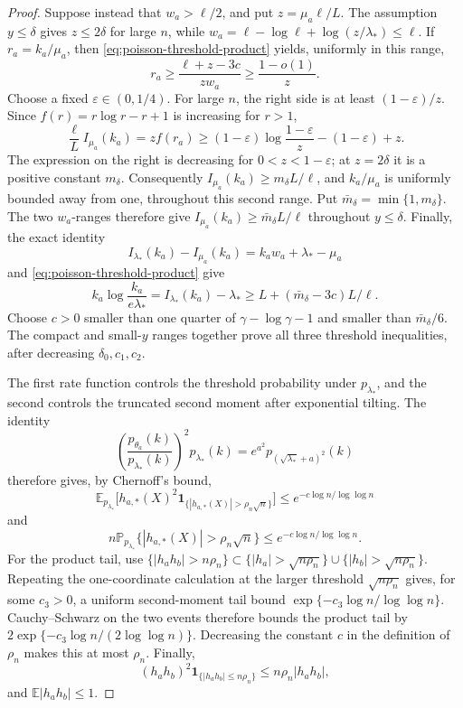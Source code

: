 \documentclass[11pt]{article}
\theoremstyle{definition}
\numberwithin{equation}{section}
\newcommand{\E}{\mathbb{E}}
\begin{document}
\begin{proof}
Suppose instead that \(w_a>\ell/2\), and put
\(z=\mu_a\ell/L\). The assumption \(y\le\delta\) gives
\(z\le2\delta\) for large \(n\), while
\(w_a=\ell-\log\ell+\log(z/\lambda_*)\le\ell\). If
\(r_a=k_a/\mu_a\), then \eqref{eq:poisson-threshold-product} yields,
uniformly in this range,
\[
 r_a\ge\frac{\ell+z-3c}{zw_a}
     \ge\frac{1-o(1)}{z}.
\]
Choose a fixed \(\varepsilon\in(0,1/4)\). For large \(n\), the right side
is at least \((1-\varepsilon)/z\). Since
\(f(r)=r\log r-r+1\) is increasing for \(r>1\),
\[
 \frac{\ell}{L}I_{\mu_a}(k_a)
 =z f(r_a)
 \ge (1-\varepsilon)\log\frac{1-\varepsilon}{z}
      -(1-\varepsilon)+z.
\]
The expression on the right is decreasing for
\(0<z<1-\varepsilon\); at \(z=2\delta\) it is a positive constant
\(m_\delta\). Consequently
\(I_{\mu_a}(k_a)\ge m_\delta L/\ell\), and
\(k_a/\mu_a\) is uniformly bounded away from one, throughout
this second range. Put \(\bar m_\delta=\min\{1,m_\delta\}\). The two
\(w_a\)-ranges therefore give
\(I_{\mu_a}(k_a)\ge\bar m_\delta L/\ell\) throughout
\(y\le\delta\). Finally, the exact identity
\[
 I_{\lambda_*}(k_a)-I_{\mu_a}(k_a)
 =k_aw_a+\lambda_*-\mu_a
\]
and \eqref{eq:poisson-threshold-product} give
\[
 k_a\log\frac{k_a}{e\lambda_*}
 =I_{\lambda_*}(k_a)-\lambda_*
 \ge L+(\bar m_\delta-3c)L/\ell.
\]
Choose \(c>0\) smaller than one quarter of
\(\gamma-\log\gamma-1\) and smaller than \(\bar m_\delta/6\).
The compact and small-\(y\) ranges together prove all three threshold
inequalities, after decreasing \(\delta_0,c_1,c_2\).

The first rate function controls the threshold probability under
\(p_{\lambda_*}\), and the second controls the truncated second moment after
exponential tilting. The identity
\[
    \left(\frac{p_{\theta_a}(k)}{p_{\lambda_*}(k)}\right)^2p_{\lambda_*}(k)
    =
    e^{a^2}p_{(\sqrt{\lambda_*}+a)^2}(k)
\]
therefore gives, by Chernoff's bound,
\[
    \E_{p_{\lambda_*}}
    \bigl[h_{a,*}(X)^2\mathbf 1_{\{|h_{a,*}(X)|>\rho_n\sqrt n\}}\bigr]
    \le e^{-c\log n/\log\log n}
\]
and
\[
    n\mathbb P_{p_{\lambda_*}}
    \{|h_{a,*}(X)|>\rho_n\sqrt n\}
    \le e^{-c\log n/\log\log n}.
\]
For the product tail, use
\(
\{|h_a h_b|>n\rho_n\}
\subset
\{|h_a|>\sqrt{n\rho_n}\}\cup\{|h_b|>\sqrt{n\rho_n}\}
\).
Repeating the one-coordinate calculation at the larger threshold
\(\sqrt{n\rho_n}\) gives, for some \(c_3>0\), a uniform second-moment
tail bound \(\exp\{-c_3\log n/\log\log n\}\). Cauchy--Schwarz on the two
events therefore bounds the product tail by
\(2\exp\{-c_3\log n/(2\log\log n)\}\). Decreasing the constant \(c\) in
the definition of \(\rho_n\) makes this at most \(\rho_n\). Finally,
\[
    (h_a h_b)^2\mathbf 1_{\{|h_a h_b|\le n\rho_n\}}
    \le n\rho_n |h_a h_b|,
\]
and \(\E|h_a h_b|\le1\).
\end{proof}
\end{document}
